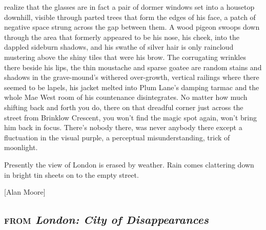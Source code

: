 \documentclass[
]{article}
\begin{document}
realize that the glasses are in fact a pair of dormer windows set into a
housetop downhill, visible through parted trees that form the edges of
his face, a patch of negative space strung across the gap between them.
A wood pigeon swoops down through the area that formerly appeared to be
his nose, his cheek, into the dappled sideburn shadows, and his swathe
of silver hair is only raincloud mustering above the shiny tiles that
were his brow. The corrugating wrinkles there beside his lips, the thin
moustache and sparse goatee are random stains and shadows in the
grave-mound's withered over-growth, vertical railings where there seemed
to be lapels, his jacket melted into Plum Lane's damping tarmac and the
whole Mae West room of his countenance disintegrates. No matter how much
shifting back and forth you do, there on that dreadful corner just
across the street from Brinklow Crescent, you won't find the magic spot
again, won't bring him back in focus. There's nobody there, was never
anybody there except a fluctuation in the visual purple, a perceptual
misunderstanding, trick of moonlight. \par
Presently the view of London is erased by weather. Rain comes
clattering down in bright tin sheets on to the empty street.

\begin{flushright}
{[}Alan Moore{]}

\subsection{\textsc{from }\emph{London: City of Disappearances}}
\end{flushright}
\end{document}
